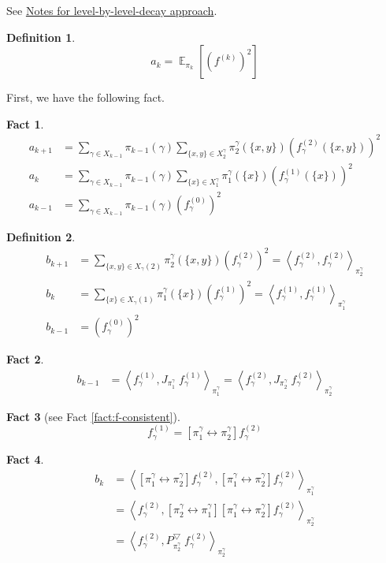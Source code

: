 \documentclass{article}
\newtheorem{define}{Definition}[section]
\newtheorem{fact}{Fact}[section]
\DeclareMathOperator*{\E}{\mathbb{E}}
\def\Op#1#2{\left[#1 \leftrightarrow #2\right]}
\def\<{\left\langle}
\def\>{\right\rangle}
\begin{document}
See \href{run:../rapid-mixing-on-matroid-basis/note.pdf}{Notes for level-by-level-decay approach}.

\begin{define}
  \[a_k = \E_{\pi_k} \left[\left(f^{(k)}\right)^2\right]\]
\end{define}

First, we have the following fact.
\begin{fact}
  \begin{align*}
    a_{k+1} &= \sum_{\gamma\in X_{k-1}}\pi_{k-1}(\gamma)\sum_{\{x,y\}\in X^\gamma_2} \pi^\gamma_2(\{x,y\}) \left(f^{(2)}_\gamma(\{x,y\})\right)^2 \\
    a_{k} &= \sum_{\gamma\in X_{k-1}}\pi_{k-1}(\gamma)\sum_{\{x\}\in X^\gamma_1} \pi^\gamma_1(\{x\}) \left(f^{(1)}_\gamma(\{x\})\right)^2 \\
    a_{k-1} &= \sum_{\gamma\in X_{k-1}}\pi_{k-1}(\gamma) \left(f^{(0)}_\gamma\right)^2
  \end{align*}
\end{fact}

\begin{define}
  \begin{align*}
    b_{k+1} &= \sum_{\{x,y\}\in X_\gamma(2)} \pi_2^\gamma (\{x,y\}) (f^{(2)}_\gamma)^2 = \<f^{(2)}_\gamma, f^{(2)}_\gamma\>_{\pi_2^\gamma}\\
    b_k &= \sum_{\{x\}\in X_\gamma(1)} \pi_1^\gamma (\{x\}) (f^{(1)}_\gamma)^2 = \<f^{(1)}_\gamma, f^{(1)}_\gamma\>_{\pi_1^\gamma} \\
    b_{k-1} &= (f^{(0)}_\gamma)^2
  \end{align*}
\end{define}

\begin{fact}
  \begin{align*}
    b_{k-1}
    &= \<f^{(1)}_\gamma, J_{\pi_1^\gamma}\; f^{(1)}_\gamma\>_{\pi_1^\gamma}
     = \<f^{(2)}_\gamma, J_{\pi_2^\gamma}\; f^{(2)}_\gamma\>_{\pi_2^\gamma}
  \end{align*}
\end{fact}

\begin{fact}[see Fact \ref{fact:f-consistent}]
  \[f^{(1)}_\gamma = \Op{\pi_1^\gamma}{\pi_2^\gamma} f^{(2)}_\gamma\]
\end{fact}
\begin{fact}
  \begin{align*}
    b_k
    &= \< \Op{\pi_1^\gamma}{\pi_2^\gamma} f^{(2)}_\gamma, \Op{\pi_1^\gamma}{\pi_2^\gamma} f^{(2)}_\gamma\>_{\pi_1^\gamma} \\
    &= \< f^{(2)}_\gamma, \Op{\pi_2^\gamma}{\pi_1^\gamma} \Op{\pi_1^\gamma}{\pi_2^\gamma} f^{(2)}_\gamma\>_{\pi_2^\gamma} \\
    &= \< f^{(2)}_\gamma, P_{\pi_2^\gamma}^{\bigtriangledown}\; f^{(2)}_\gamma\>_{\pi_2^\gamma}
  \end{align*}
\end{fact}
\end{document}
